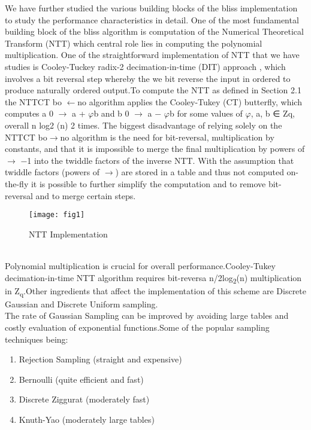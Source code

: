 \documentclass[conference]{IEEEtran}
\begin{document}
We have further studied the various building blocks of the bliss implementation to study the performance characteristics in detail.
One of the most fundamental building block of the bliss algorithm is computation of the Numerical Theoretical Transform (NTT) which central role lies in computing the polynomial multiplication. One of the straightforward implementation of NTT that we have studies is Cooley-Tuckey radix-2 decimation-in-time (DIT) approach , which involves a bit reversal step whereby the we bit reverse the input in ordered to produce naturally ordered output.To compute the NTT
as defined in Section 2.1 the NTTCT
bo $\leftarrow$no algorithm applies the Cooley-Tukey (CT) butterfly, which computes a
0 $\rightarrow$ a + $\varphi$b and b
0 $\rightarrow$ a − $\varphi$b for some values of $\varphi$, a, b ∈ Zq, overall n log2
(n)
2
times.
The biggest disadvantage of relying solely on the NTTCT
bo$\rightarrow$no algorithm is the need for bit-reversal,
multiplication by constants, and that it is impossible to merge the final multiplication by powers of
$\rightarrow$
−1
into the twiddle factors of the inverse NTT. With the assumption that twiddle factors
(powers of $\rightarrow$) are stored in a table and thus not computed on-the-fly it is possible to further simplify
the computation and to remove bit-reversal and to merge certain steps.
\\
\begin{figure}[htp]
\centering
\texttt{[image: fig1]}
\caption{NTT Implementation}
\label{fig:lion}
\end{figure}
\\
Polynomial multiplication is crucial for overall performance.Cooley-Tukey decimation-in-time NTT algorithm requires
bit-reversa n/2log\textsubscript{2}(n) multiplication in Z\textsubscript{q}.Other ingredients that affect the implementation of this scheme are Discrete Gaussian and Discrete Uniform sampling.
\\
The rate of Gaussian Sampling  can be improved by avoiding large tables and costly evaluation of exponential functions.Some of the popular sampling techniques being:
\begin{enumerate}
    \item Rejection Sampling  (straight and expensive)
    \item Bernoulli  (quite efficient and fast)
    \item Discrete Ziggurat (moderately fast)
    \item Knuth-Yao (moderately large tables)
\end{enumerate}
\end{document}
